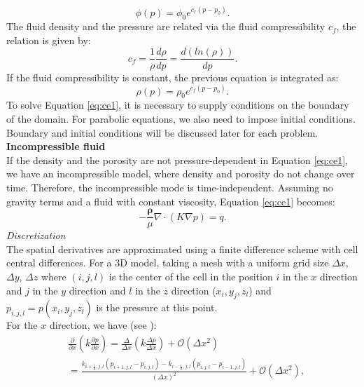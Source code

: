 \documentclass[12pt]{report}
\begin{document}
\begin{equation}\label{eq:por}
 \phi(p)=\phi_0 e^{c_r(p-p_0)}.
\end{equation}
The fluid density and the pressure are related via the fluid compressibility $c_f$, the relation is given by:
\begin{equation*}\label{eq:fc}
 c_f=\frac{1}{\rho}\frac{d\rho}{dp}=\frac{d(ln(\rho))}{dp}.
\end{equation*}
If the fluid compressibility is constant, the previous equation is integrated as:
\begin{equation}\label{eq:rhoeq}
 \rho(p)=\rho_0 e^{c_f({p}-{p}_0)}.
\end{equation}
To solve Equation \eqref{eq:ce1}, it is necessary to supply conditions on the boundary of the domain. For parabolic equations, we also need to impose initial conditions. Boundary and initial conditions will be discussed later for each problem.   \\
\textbf{Incompressible fluid}\\
If the density and the porosity are not pressure-dependent in Equation \eqref{eq:ce1}, we have an incompressible model, where density and porosity do not change over time. Therefore, the incompressible mode is time-independent. Assuming no gravity terms and a fluid with constant viscosity, Equation \eqref{eq:ce1} becomes:
\begin{equation}\label{eq:cel}
-\frac{\mathbf{\rho}}{\mu}\nabla \cdot \left({K} \nabla p\right)=q.
\end{equation}
\emph{Discretization}\\
The spatial derivatives are approximated using a finite difference scheme with cell central 
differences. For a 3D model, taking a mesh with a uniform grid size $\Delta x$, $\Delta y$, $\Delta z$ where $(i,j,l)$ is the center 
of the cell
in the position $i$ in the $x$ direction and $j$ in the $y$ direction and $l$ in the $z$ direction
($x_i,y_j,z_l$) and $p_{i,j,l}=p(x_i,y_j,z_l)$ is 
the pressure at this point.
\\ For the $x$ direction, we have (see \cite{Jansen13}):
\begin{align*}
&\frac{\partial}{\partial x}\left(k\frac{\partial p}{\partial x}\right) = 
\frac{\Delta}{\Delta x}\left(k\frac{\Delta p}{\Delta x}\right) +\mathscr{O}(\Delta x^2)\\
&=\frac{ k_{i+\frac{1}{2},j,l}(p_{i+1,j,l}-p_{i,j,l})-k_{i-\frac{1}{2},j,l}(p_{i,j,l}-p_{i-1,j,l})}{\left( \Delta x\right)^2}+\mathscr{O}(\Delta x^2),
\end{align*}
\end{document}
